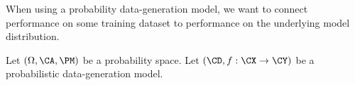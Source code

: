 

When using a probability data-generation model, we want to connect performance on some training dataset to performance on the underlying model distribution.


Let $(\Omega, \CA, \PM)$ be a probability space.
Let $(\CD, f: \CX \to \CY)$ be a probabilistic data-generation model.


\blankpage
